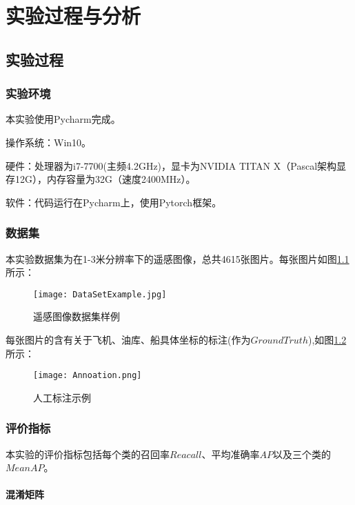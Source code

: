 
\chapter{实验过程与分析}

\section{实验过程}

\subsection{实验环境}
本实验使用Pycharm完成。

操作系统：Win10。

硬件：处理器为i7-7700(主频4.2GHz)，显卡为NVIDIA TITAN X（Pascal架构显存12G），内存容量为32G（速度2400MHz）。

软件：代码运行在Pycharm上，使用Pytorch框架。

\subsection{数据集}
本实验数据集为在1-3米分辨率下的遥感图像，总共4615张图片。每张图片如图\ref{DataSetExample}所示：

\begin{figure}
	\center
	{\texttt{[image: DataSetExample.jpg]}}
	\caption{遥感图像数据集样例}
	\label{DataSetExample}
\end{figure}

每张图片的含有关于飞机、油库、船具体坐标的标注(作为$Ground Truth$),如图\ref{Annoation}所示：

\begin{figure}
	\center
	{\texttt{[image: Annoation.png]}}
	\caption{人工标注示例}
	\label{Annoation}
\end{figure}

\subsection{评价指标}

本实验的评价指标包括每个类的召回率$Reacall$、平均准确率$AP$以及三个类的$MeanAP$。

\subsubsection{混淆矩阵}

